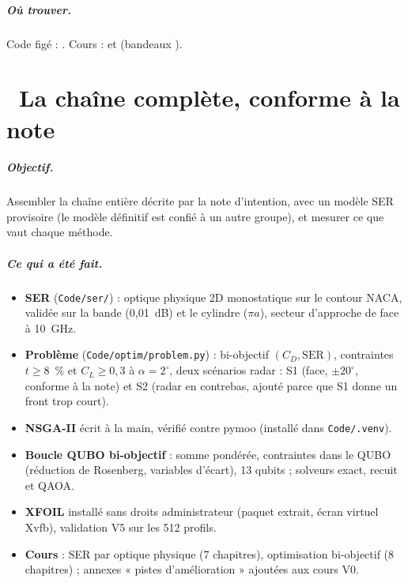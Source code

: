 \documentclass[11pt,a4paper]{report}
\newcommand{\iterchapter}[2]{\chapter{\texorpdfstring{\protect\iterbadge{#1}\ }{#1 : }#2}\iterbanner{#1}}
\begin{document}
\paragraph{Où trouver.} Code figé : . Cours :  et  (bandeaux ).

\iterchapter{V1}{La chaîne complète, conforme à la note}
\paragraph{Objectif.} Assembler la chaîne entière décrite par la note d'intention, avec un modèle SER provisoire (le modèle définitif est confié à un autre groupe), et mesurer ce que vaut chaque méthode.

\paragraph{Ce qui a été fait.}
\begin{itemize}
\item \textbf{SER} (\texttt{Code/ser/}) : optique physique 2D monostatique sur le contour NACA, validée sur la bande (0,01~dB) et le cylindre ($\pi a$), secteur d'approche de face à 10~GHz.
\item \textbf{Problème} (\texttt{Code/optim/problem.py}) : bi-objectif $(C_D,\mathrm{SER})$, contraintes $t\ge8$~\% et $C_L\ge0{,}3$ à $\alpha=2^\circ$, deux scénarios radar : S1 (face, $\pm20^\circ$, conforme à la note) et S2 (radar en contrebas, ajouté parce que S1 donne un front trop court).
\item \textbf{NSGA-II} écrit à la main, vérifié contre pymoo (installé dans \texttt{Code/.venv}).
\item \textbf{Boucle QUBO bi-objectif} : somme pondérée, contraintes dans le QUBO (réduction de Rosenberg, variables d'écart), 13 qubits ; solveurs exact, recuit et QAOA.
\item \textbf{XFOIL} installé sans droits administrateur (paquet extrait, écran virtuel Xvfb), validation V5 sur les 512 profils.
\item \textbf{Cours} : SER par optique physique (7 chapitres), optimisation bi-objectif (8 chapitres) ; annexes « pistes d'amélioration » ajoutées aux cours V0.
\end{itemize}
\end{document}
